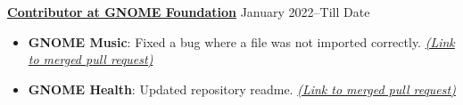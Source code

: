 \textbf{\href{https://gitlab.gnome.org/KoushikSahu}{Contributor at GNOME Foundation}} \hfill January 2022--Till Date \par
\begin{itemize}
	\item \textbf{GNOME Music}: Fixed a bug where a file was not imported correctly. \href{https://gitlab.gnome.org/GNOME/gnome-music/-/merge_requests/905}{\emph{(Link to merged pull request)}}
	\item \textbf{GNOME Health}: Updated repository readme. \href{https://gitlab.gnome.org/World/Health/-/merge_requests/170}{\emph{(Link to merged pull request)}}
\end{itemize}\vspace{0.1cm} \par